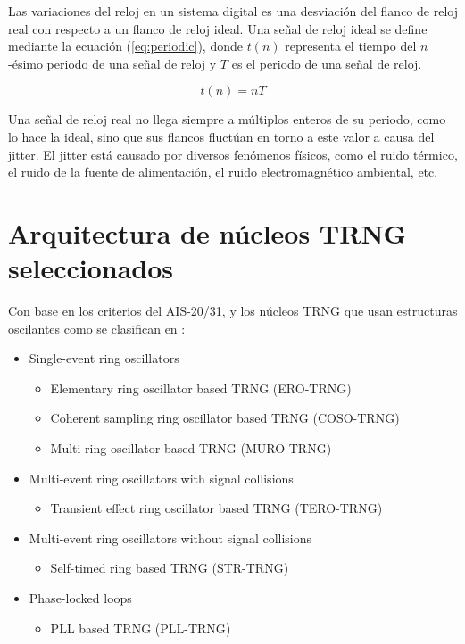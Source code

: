 	Las variaciones del reloj en un sistema digital es una desviación del flanco de reloj real con respecto a un flanco de reloj ideal. Una señal de reloj ideal se define mediante la ecuación (\ref{eq:periodic}), donde $t(n)$ representa el tiempo del $n$-ésimo periodo de una señal de reloj y $T$ es el periodo de una señal de reloj.
	
	\begin{equation}
		t(n) =  n T
	\label{eq:periodic}
	\end{equation}
	
	Una señal de reloj real no llega siempre a múltiplos enteros de su periodo, como lo hace la ideal, sino que sus flancos fluctúan en torno a este valor a causa del jitter. El jitter está causado por diversos fenómenos físicos, como el ruido térmico, el ruido de la fuente de alimentación, el ruido electromagnético ambiental, etc.	
	
	
	
	\section{Arquitectura de núcleos TRNG seleccionados}

	Con base en los criterios del AIS-20/31, y los núcleos \gls{TRNG} que usan estructuras oscilantes como se clasifican en \cite{Petura2016}:
	
	\begin{itemize}
		\item Single-event ring oscillators
			\begin{itemize}
				\item Elementary ring oscillator based TRNG (\gls{ERO-TRNG})
				\item Coherent sampling ring oscillator based TRNG (\gls{COSO-TRNG})
				\item Multi-ring oscillator based TRNG (\gls{MURO-TRNG})
			\end{itemize}
		\item Multi-event ring oscillators with signal collisions
			\begin{itemize}
				\item Transient effect ring oscillator based TRNG (\gls{TERO-TRNG})
			\end{itemize}
		\item Multi-event ring oscillators without signal collisions
			\begin{itemize}
				\item Self-timed ring based TRNG (\gls{STR-TRNG})
			\end{itemize}
		\item Phase-locked loops
			\begin{itemize}
				\item PLL based TRNG (\gls{PLL-TRNG})
			\end{itemize}
	\end{itemize}
	
